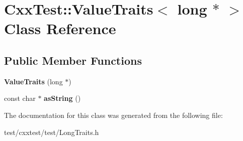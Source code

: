 \hypertarget{classCxxTest_1_1ValueTraits_3_01long_01_5_01_4}{\section{Cxx\-Test\-:\-:Value\-Traits$<$ long $\ast$ $>$ Class Reference}
\label{classCxxTest_1_1ValueTraits_3_01long_01_5_01_4}
}
\subsection*{Public Member Functions}
\begin{DoxyCompactItemize}
\item 
\hypertarget{classCxxTest_1_1ValueTraits_3_01long_01_5_01_4_ac625d3fcb46574b4ac386fadbbd31faa}{{\bfseries Value\-Traits} (long $\ast$)}\label{classCxxTest_1_1ValueTraits_3_01long_01_5_01_4_ac625d3fcb46574b4ac386fadbbd31faa}

\item 
\hypertarget{classCxxTest_1_1ValueTraits_3_01long_01_5_01_4_afcf5e8ec4084bc9552a7c8fe365af91a}{const char $\ast$ {\bfseries as\-String} ()}\label{classCxxTest_1_1ValueTraits_3_01long_01_5_01_4_afcf5e8ec4084bc9552a7c8fe365af91a}

\end{DoxyCompactItemize}


The documentation for this class was generated from the following file\-:\begin{DoxyCompactItemize}
\item 
test/cxxtest/test/Long\-Traits.\-h\end{DoxyCompactItemize}
